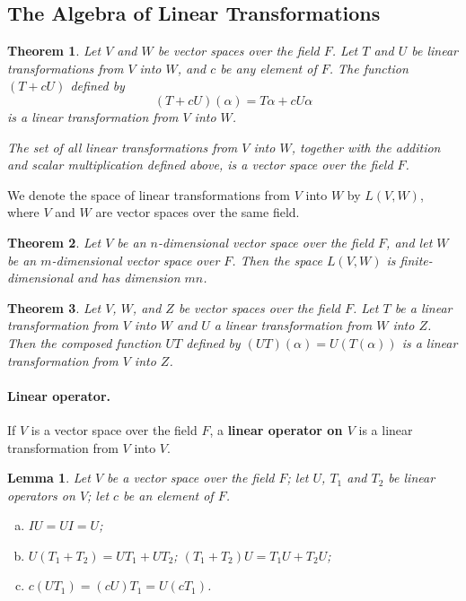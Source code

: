 \documentclass{article}
\newtheorem{theorem}{Theorem}[section]
\newtheorem*{lemma*}{Lemma}
\begin{document}
\subsection{The Algebra of Linear Transformations}

\begin{theorem}
  Let $V$ and $W$ be vector spaces over the field $F$. Let $T$ and $U$ be linear
  transformations from $V$ into $W$, and $c$ be any element of $F$. The function
  $(T + cU)$ defined by \[
    (T + cU)(\alpha) = T\alpha + cU\alpha
  \] is a linear transformation from $V$ into $W$.

  The set of all linear transformations from $V$ into $W$, together with the
  addition and scalar multiplication defined above, is a vector space over the
  field $F$.
\end{theorem}

We denote the space of linear transformations from $V$ into $W$ by $L(V, W)$,
where $V$ and $W$ are vector spaces over the same field.

\begin{theorem}
  Let $V$ be an $n$-dimensional vector space over the field $F$, and let $W$ be
  an $m$-dimensional vector space over $F$. Then the space $L(V, W)$ is
  finite-dimensional and has dimension $mn$.
\end{theorem}

\begin{theorem}
  Let $V$, $W$, and $Z$ be vector spaces over the field $F$. Let $T$ be a linear
  transformation from $V$ into $W$ and $U$ a linear transformation from $W$ into
  $Z$. Then the composed function $UT$ defined by $(UT)(\alpha) = U(T(\alpha))$
  is a linear transformation from $V$ into $Z$.
\end{theorem}

\paragraph{Linear operator.} If $V$ is a vector space over the field $F$, a
\textbf{linear operator on $V$} is a linear transformation from $V$ into $V$.

\begin{lemma*}
  Let $V$ be a vector space over the field $F$; let $U$, $T_1$ and $T_2$ be
  linear operators on $V$; let $c$ be an element of $F$.
  \begin{enumerate}[(a)]
    \item $IU = UI = U$;
    \item $U(T_1 + T_2) = UT_1 + UT_2$; $(T_1 + T_2)U = T_1U + T_2U$;
    \item $c(UT_1) = (cU)T_1 = U(cT_1)$.
  \end{enumerate}
\end{lemma*}
\end{document}
